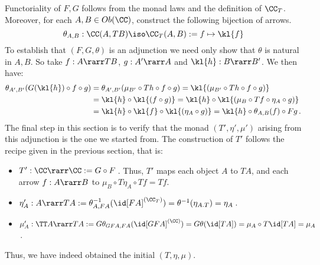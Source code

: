 \documentclass{svmult}
\begin{document}
Functoriality of $F,G$ follows from the monad laws and the definition of $\CC_T$.
Moreover, for each $A,B\in Ob(\CC)$, construct the following bijection of arrows.
\[ \theta_{A,B}:\CC(A,TB)\iso\CC_T(A,B):= f\mapsto\kl{f} \]
To establish that $(F,G,\theta)$ is an adjunction we need only show that $\theta$ is natural in $A,B$. So take $f:A\rarr TB$, $g:A'\rarr A$ and
$\kl{h}:B\rarr B'$. We then have:
\begin{align*}
  \theta_{A',B'}(G(\kl{h})\circ f\circ g) &= \theta_{A',B'}(\mu_{B'}\circ Th\circ f\circ g) = \kl{(\mu_{B'}\circ Th\circ f\circ g)} \\
    &= \kl{h}\circ\kl{(f\circ g)} = \kl{h}\circ\kl{(\mu_B\circ Tf\circ\eta_A\circ g)}\\
    &= \kl{h}\circ\kl{f}\circ\kl{(\eta_A\circ g)} = \kl{h}\circ\theta_{A,B}(f)\circ Fg\,.
\end{align*}
The final step in this section is to verify that the monad $(T',\eta',\mu')$ arising from this adjunction is the one we started from. The
construction of $T'$ follows the recipe given in the previous section, that is:
\begin{itemize}
  \item $T':\CC\rarr\CC:=G\circ F$\,. Thus, $T'$ maps each object $A$ to $TA$, and each arrow $f:A\rarr B$ to $\mu_B\circ T\eta_A\circ Tf=Tf$.
  \item $\eta'_A:A\rarr TA:=\theta_{A,FA}^{-1}(\id[FA]^{(\CC_T)})=\theta^{-1}(\eta_{A.T})=\eta_A$\,.
  \item $\mu'_A:\TT A\rarr TA:=G\theta_{GFA,FA}(\id[GFA]^{(\CC)})=G\theta(\id[TA])=\mu_A\circ T\id[TA]=\mu_A$\,.
\end{itemize}
Thus, we have indeed obtained the initial $(T,\eta,\mu)$.
\end{document}
